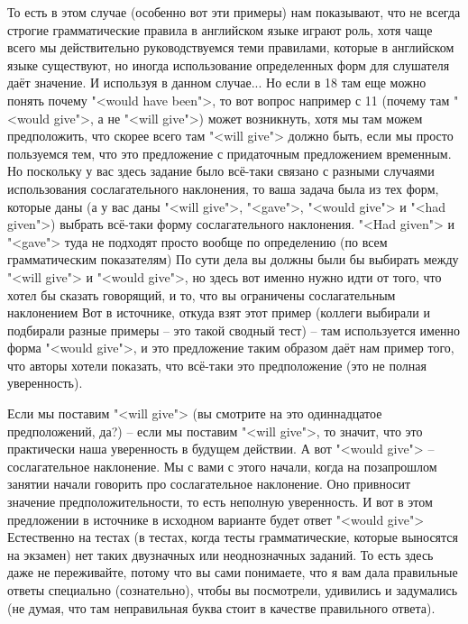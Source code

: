 \documentclass[main.tex]{subfiles}
\begin{document}
То есть в этом случае (особенно вот эти примеры) нам показывают, что не всегда строгие грамматические правила в английском языке играют роль, хотя чаще всего мы действительно руководствуемся теми правилами, которые в английском языке существуют, но иногда использование определенных форм для слушателя даёт значение.
И используя в данном случае...
Но если в 18 там еще можно понять почему "<would have been">, то вот вопрос например с 11 (почему там "<would give">, а не "<will give">) может возникнуть, хотя мы там можем предположить, что скорее всего там "<will give"> должно быть, если мы просто пользуемся тем, что это предложение с придаточным предложением временным.
Но поскольку у вас здесь задание было всё-таки связано с разными случаями использования сослагательного наклонения, то ваша задача была из тех форм, которые даны (а у вас даны "<will give">, "<gave">, "<would give"> и "<had given">) выбрать всё-таки форму сослагательного наклонения.
"<Had given"> и "<gave"> туда не подходят просто вообще по определению (по всем грамматическим показателям)
По сути дела вы должны были бы выбирать между "<will give"> и "<would give">, но здесь вот именно нужно идти от того, что хотел бы сказать говорящий, и то, что вы ограничены сослагательным наклонением
Вот в источнике, откуда взят этот пример (коллеги выбирали и подбирали разные примеры -- это такой сводный тест) -- там используется именно форма "<would give">, и это предложение таким образом даёт нам пример того, что авторы хотели показать, что всё-таки это предположение (это не полная уверенность).

Если мы поставим "<will give"> (вы смотрите на это одиннадцатое предположений, да?) -- если мы поставим "<will give">, то значит, что это практически наша уверенность в будущем действии.
А вот "<would give"> -- сослагательное наклонение.
Мы с вами с этого начали, когда на позапрошлом занятии начали говорить про сослагательное наклонение.
Оно привносит значение предположительности, то есть неполную уверенность.
И вот в этом предложении в источнике в исходном варианте будет ответ "<would give">
Естественно на тестах (в тестах, когда тесты грамматические, которые выносятся на экзамен) нет таких двузначных или неоднозначных заданий.
То есть здесь даже не переживайте, потому что вы сами понимаете, что я вам дала правильные ответы специально (сознательно), чтобы вы посмотрели, удивились и задумались (не думая, что там неправильная буква стоит в качестве правильного ответа).
\end{document}
